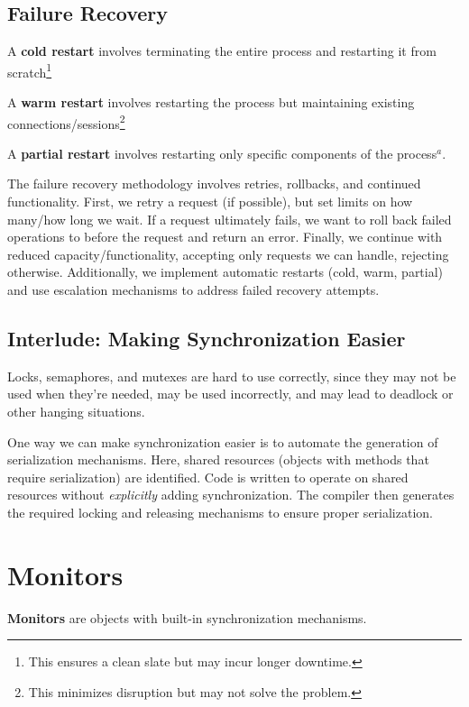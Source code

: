 \documentclass{report}
\newcommand{\definitionBegin}[1]{\begin{tcolorbox}[title={Definition: #1}]}
\newcommand{\definitionEnd}{\end{tcolorbox}}
\begin{document}
\subsection{Failure Recovery}
\definitionBegin{Cold Restart}
A \textbf{cold restart} involves terminating the entire process and restarting it from
scratch\footnote{This ensures a clean slate but may incur longer downtime.}
\definitionEnd

\definitionBegin{Warm Restart}
A \textbf{warm restart} involves restarting the process but maintaining existing
connections/sessions\footnote{This minimizes disruption but may not solve the problem.} 
\definitionEnd

\definitionBegin{Partial Restart}
A \textbf{partial restart} involves restarting only specific components of the process$^a$.
\definitionEnd

The failure recovery methodology involves retries, rollbacks, and continued functionality. First, we
retry a request (if possible), but set limits on how many/how long we wait. If a request ultimately
fails, we want to roll back failed operations to before the request and return an error. Finally, we
continue with reduced capacity/functionality, accepting only requests we can handle, rejecting
otherwise. Additionally, we implement automatic restarts (cold, warm, partial) and use escalation
mechanisms to address failed recovery attempts.


\subsection*{Interlude: Making Synchronization Easier}
Locks, semaphores, and mutexes are hard to use correctly, since they may not be used when they're
needed, may be used incorrectly, and may lead to deadlock or other hanging situations.

One way we can make synchronization easier is to automate the generation of serialization
mechanisms. Here, shared resources (objects with methods that require serialization) are
identified. Code is written to operate on shared resources without \textit{explicitly} adding
synchronization. The compiler then generates the required locking and releasing mechanisms to ensure
proper serialization.





\section{Monitors}
\definitionBegin{Monitors}
\textbf{Monitors} are objects with built-in synchronization mechanisms.
\definitionEnd
\end{document}
